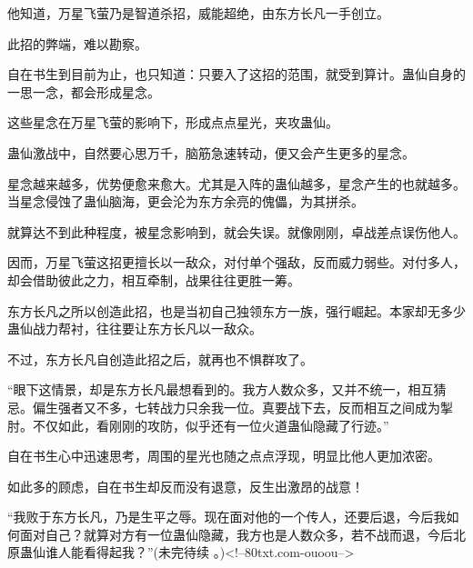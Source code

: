 \begin{this_body}
他知道，万星飞萤乃是智道杀招，威能超绝，由东方长凡一手创立。

此招的弊端，难以勘察。

自在书生到目前为止，也只知道：只要入了这招的范围，就受到算计。蛊仙自身的一思一念，都会形成星念。

这些星念在万星飞萤的影响下，形成点点星光，夹攻蛊仙。

蛊仙激战中，自然要心思万千，脑筋急速转动，便又会产生更多的星念。

星念越来越多，优势便愈来愈大。尤其是入阵的蛊仙越多，星念产生的也就越多。当星念侵蚀了蛊仙脑海，更会沦为东方余亮的傀儡，为其拼杀。

就算达不到此种程度，被星念影响到，就会失误。就像刚刚，卓战差点误伤他人。

因而，万星飞萤这招更擅长以一敌众，对付单个强敌，反而威力弱些。对付多人，却会借助彼此之力，相互牵制，战果往往更胜一筹。

东方长凡之所以创造此招，也是当初自己独领东方一族，强行崛起。本家却无多少蛊仙战力帮衬，往往要让东方长凡以一敌众。

不过，东方长凡自创造此招之后，就再也不惧群攻了。

“眼下这情景，却是东方长凡最想看到的。我方人数众多，又并不统一，相互猜忌。偏生强者又不多，七转战力只余我一位。真要战下去，反而相互之间成为掣肘。不仅如此，看刚刚的攻防，似乎还有一位火道蛊仙隐藏了行迹。”

自在书生心中迅速思考，周围的星光也随之点点浮现，明显比他人更加浓密。

如此多的顾虑，自在书生却反而没有退意，反生出激昂的战意！

“我败于东方长凡，乃是生平之辱。现在面对他的一个传人，还要后退，今后我如何面对自己？就算对方有一位蛊仙隐藏，我方也是人数众多，若不战而退，今后北原蛊仙谁人能看得起我？”(未完待续 。)<!--80txt.com-ouoou-->

\end{this_body}

